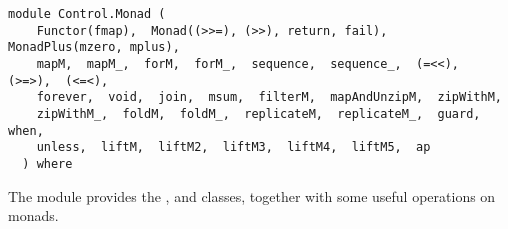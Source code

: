 \label{module:Control.Monad}
\haddockbeginheader
{\haddockverb\begin{verbatim}
module Control.Monad (
    Functor(fmap),  Monad((>>=), (>>), return, fail),  MonadPlus(mzero, mplus), 
    mapM,  mapM_,  forM,  forM_,  sequence,  sequence_,  (=<<),  (>=>),  (<=<), 
    forever,  void,  join,  msum,  filterM,  mapAndUnzipM,  zipWithM, 
    zipWithM_,  foldM,  foldM_,  replicateM,  replicateM_,  guard,  when, 
    unless,  liftM,  liftM2,  liftM3,  liftM4,  liftM5,  ap
  ) where\end{verbatim}}
\haddockendheader

The  module provides the ,  and
  classes, together with some useful operations on monads.
\par

